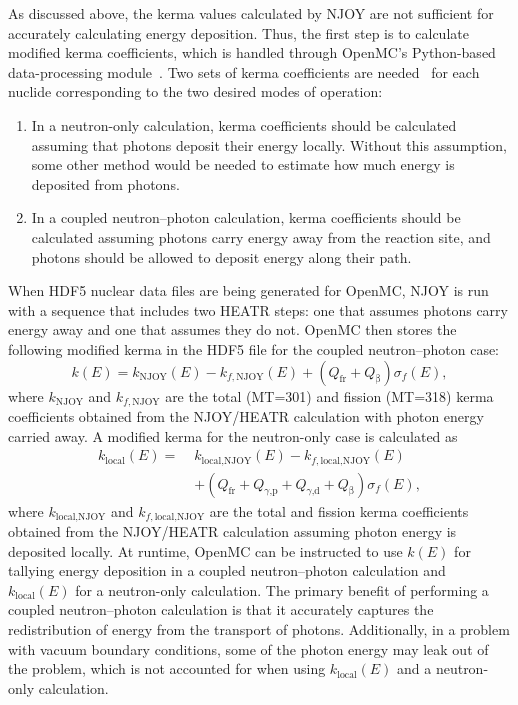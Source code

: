 \documentclass{anstrans}
\newcommand{\efr}{Q_\text{fr}}
\newcommand{\egp}{Q_\text{$\gamma$,p}}
\newcommand{\egd}{Q_\text{$\gamma$,d}}
\newcommand{\eb}{Q_\upbeta}
\begin{document}
As discussed above, the kerma values calculated by NJOY are not sufficient for
accurately calculating energy deposition. Thus, the first step is to calculate
modified kerma coefficients, which is handled through OpenMC's Python-based
data-processing module~\cite{romano2017epjwoc}. Two sets of kerma coefficients
are needed~\cite{trumbull2013mc} for each nuclide corresponding to the two
desired modes of operation:
\begin{enumerate}
    \item In a neutron-only calculation, kerma coefficients should be calculated
    assuming that photons deposit their energy locally. Without this assumption,
    some other method would be needed to estimate how much energy is deposited
    from photons.
    \item In a coupled neutron--photon calculation, kerma coefficients should be
    calculated assuming photons carry energy away from the reaction site, and
    photons should be allowed to deposit energy along their path.
\end{enumerate}
When HDF5 nuclear data files are being generated for OpenMC, NJOY is run with a
sequence that includes two HEATR steps: one that assumes photons carry energy
away and one that assumes they do not. OpenMC then stores the following modified
kerma in the HDF5 file for the coupled neutron--photon case:
\begin{equation}
\label{eq:k}
k(E) = k_\text{NJOY}(E) - k_{f,\text{NJOY}}(E) + \left ( \efr +
        \eb \right ) \sigma_f(E),
\end{equation}
where $k_\text{NJOY}$ and $k_{f,\text{NJOY}}$ are the total (MT=301) and fission
(MT=318) kerma coefficients obtained from the NJOY/HEATR calculation with photon
energy carried away. A modified kerma for the neutron-only case is calculated as
\begin{equation}
    \label{eq:klocal}
    \begin{split}
    k_\text{local}(E) = \; &k_\text{local,NJOY}(E) - k_{f,\text{local,NJOY}}(E) \\
        &+ \left ( \efr + \egp + \egd + \eb \right )  \sigma_f(E),
    \end{split}
\end{equation}
where $k_\text{local,NJOY}$ and $k_{f,\text{local,NJOY}}$ are the total and
fission kerma coefficients obtained from the NJOY/HEATR calculation assuming
photon energy is deposited locally. At runtime, OpenMC can be instructed to use
$k(E)$ for tallying energy deposition in a coupled neutron--photon calculation
and $k_\text{local}(E)$ for a neutron-only calculation. The primary benefit of
performing a coupled neutron--photon calculation is that it accurately captures
the redistribution of energy from the transport of photons. Additionally, in a
problem with vacuum boundary conditions, some of the photon energy may leak out
of the problem, which is not accounted for when using $k_\text{local}(E)$ and a
neutron-only calculation.
\end{document}
